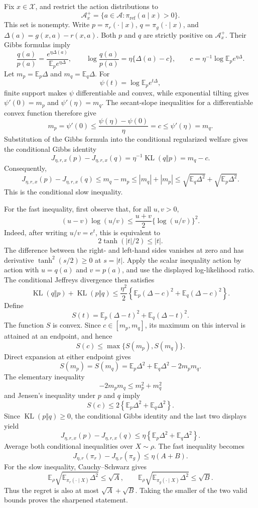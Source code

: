 Fix \(x\in\mathcal X\), and restrict the action distributions to
\[
\mathcal A_x^+=\{a\in\mathcal A:\pi_{\mathrm{ref}}(a\mid x)>0\}.
\]
This set is nonempty. Write \(p=\pi_r(\cdot\mid x)\), \(q=\pi_g(\cdot\mid x)\), and \(\Delta(a)=g(x,a)-r(x,a)\). Both \(p\) and \(q\) are strictly positive on \(\mathcal A_x^+\). Their Gibbs formulas imply
\[
\frac{q(a)}{p(a)}
=\frac{e^{\eta\Delta(a)}}{\mathbb E_p e^{\eta\Delta}},
\qquad
\log\frac{q(a)}{p(a)}
=\eta\{\Delta(a)-c\},
\qquad
c=\eta^{-1}\log\mathbb E_p e^{\eta\Delta}.
\]
Let \(m_p=\mathbb E_p\Delta\) and \(m_q=\mathbb E_q\Delta\). For
\[
\psi(t)=\log\mathbb E_p e^{t\Delta},
\]
finite support makes \(\psi\) differentiable and convex, while exponential tilting gives \(\psi'(0)=m_p\) and \(\psi'(\eta)=m_q\). The secant-slope inequalities for a differentiable convex function therefore give
\[
m_p=\psi'(0)
\le\frac{\psi(\eta)-\psi(0)}{\eta}
=c
\le\psi'(\eta)=m_q.
\]
Substitution of the Gibbs formula into the conditional regularized welfare gives the conditional Gibbs identity
\[
J_{\eta,r,x}(p)-J_{\eta,r,x}(q)
=\eta^{-1}\operatorname{KL}(q\Vert p)
=m_q-c.
\]
Consequently,
\[
J_{\eta,r,x}(p)-J_{\eta,r,x}(q)
\le m_q-m_p
\le |m_q|+|m_p|
\le\sqrt{\mathbb E_q\Delta^2}+\sqrt{\mathbb E_p\Delta^2}.
\]
This is the conditional slow inequality.

For the fast inequality, first observe that, for all \(u,v>0\),
\[
(u-v)\log(u/v)
\le\frac{u+v}{2}\{\log(u/v)\}^2.
\]
Indeed, after writing \(u/v=e^t\), this is equivalent to
\[
2\tanh(|t|/2)\le |t|.
\]
The difference between the right- and left-hand sides vanishes at zero and has derivative \(\tanh^2(s/2)\ge0\) at \(s=|t|\). Apply the scalar inequality action by action with \(u=q(a)\) and \(v=p(a)\), and use the displayed log-likelihood ratio. The conditional Jeffreys divergence then satisfies
\[
\operatorname{KL}(q\Vert p)+\operatorname{KL}(p\Vert q)
\le\frac{\eta^2}{2}
\left\{\mathbb E_p(\Delta-c)^2+\mathbb E_q(\Delta-c)^2\right\}.
\]
Define
\[
S(t)=\mathbb E_p(\Delta-t)^2+\mathbb E_q(\Delta-t)^2.
\]
The function \(S\) is convex. Since \(c\in[m_p,m_q]\), its maximum on this interval is attained at an endpoint, and hence
\[
S(c)\le\max\{S(m_p),S(m_q)\}.
\]
Direct expansion at either endpoint gives
\[
S(m_p)=S(m_q)
=\mathbb E_p\Delta^2+\mathbb E_q\Delta^2-2m_pm_q.
\]
The elementary inequality
\[
-2m_pm_q\le m_p^2+m_q^2
\]
and Jensen's inequality under \(p\) and \(q\) imply
\[
S(c)
\le2\left\{\mathbb E_p\Delta^2+\mathbb E_q\Delta^2\right\}.
\]
Since \(\operatorname{KL}(p\Vert q)\ge0\), the conditional Gibbs identity and the last two displays yield
\[
J_{\eta,r,x}(p)-J_{\eta,r,x}(q)
\le\eta\left\{\mathbb E_p\Delta^2+\mathbb E_q\Delta^2\right\}.
\]
Average both conditional inequalities over \(X\sim\rho\). The fast inequality becomes
\[
J_{\eta,r}(\pi_r)-J_{\eta,r}(\pi_g)\le\eta(A+B).
\]
For the slow inequality, Cauchy--Schwarz gives
\[
\mathbb E_\rho
\sqrt{\mathbb E_{\pi_r(\cdot\mid X)}\Delta^2}
\le\sqrt A,
\qquad
\mathbb E_\rho
\sqrt{\mathbb E_{\pi_g(\cdot\mid X)}\Delta^2}
\le\sqrt B.
\]
Thus the regret is also at most \(\sqrt A+\sqrt B\). Taking the smaller of the two valid bounds proves the sharpened statement.